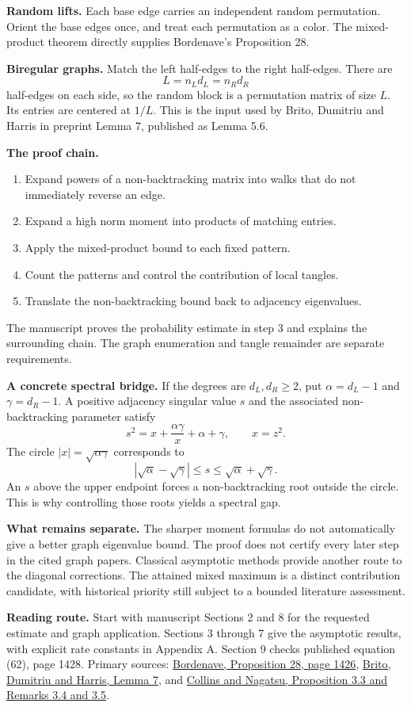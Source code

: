 \documentclass[11pt]{article}
\newcommand{\pagetitle}[2]{\noindent{\small\sffamily\color{teal}#1}\par\vspace{5pt}\noindent{\LARGE\bfseries\color{ink}#2}\par\vspace{12pt}}
\begin{document}
\newpage
\pagetitle{BACK TO GRAPHS}{What this proves for the spectral argument}

\textbf{Random lifts.} Each base edge carries an independent random permutation. Orient the base edges once, and treat each permutation as a color. The mixed-product theorem directly supplies Bordenave's Proposition 28.

\textbf{Biregular graphs.} Match the left half-edges to the right half-edges. There are
\[
L=n_Ld_L=n_Rd_R
\]
half-edges on each side, so the random block is a permutation matrix of size $L$. Its entries are centered at $1/L$. This is the input used by Brito, Dumitriu and Harris in preprint Lemma 7, published as Lemma 5.6.

\textbf{The proof chain.}
\begin{enumerate}
\item Expand powers of a non-backtracking matrix into walks that do not immediately reverse an edge.
\item Expand a high norm moment into products of matching entries.
\item Apply the mixed-product bound to each fixed pattern.
\item Count the patterns and control the contribution of local tangles.
\item Translate the non-backtracking bound back to adjacency eigenvalues.
\end{enumerate}
The manuscript proves the probability estimate in step 3 and explains the surrounding chain. The graph enumeration and tangle remainder are separate requirements.

\textbf{A concrete spectral bridge.} If the degrees are $d_L,d_R\ge2$, put $\alpha=d_L-1$ and $\gamma=d_R-1$. A positive adjacency singular value $s$ and the associated non-backtracking parameter satisfy
\[
s^2=x+\frac{\alpha\gamma}{x}+\alpha+\gamma,\qquad x=z^2.
\]
The circle $|x|=\sqrt{\alpha\gamma}$ corresponds to
\[
|\sqrt\alpha-\sqrt\gamma|\le s\le\sqrt\alpha+\sqrt\gamma.
\]
An $s$ above the upper endpoint forces a non-backtracking root outside the circle. This is why controlling those roots yields a spectral gap.

\textbf{What remains separate.} The sharper moment formulas do not automatically give a better graph eigenvalue bound. The proof does not certify every later step in the cited graph papers. Classical asymptotic methods provide another route to the diagonal corrections. The attained mixed maximum is a distinct contribution candidate, with historical priority still subject to a bounded literature assessment.

\vfill
{\small\color{ink}\textbf{Reading route.} Start with manuscript Sections 2 and 8 for the requested estimate and graph application. Sections 3 through 7 give the asymptotic results, with explicit rate constants in Appendix A. Section 9 checks published equation (62), page 1428. Primary sources: \href{https://smf.emath.fr/download/pdf/1498332}{Bordenave, Proposition 28, page 1426}, \href{https://arxiv.org/abs/1804.07808v6}{Brito, Dumitriu and Harris, Lemma 7}, and \href{https://doi.org/10.5802/alco.480}{Collins and Nagatsu, Proposition 3.3 and Remarks 3.4 and 3.5}.}
\end{document}
